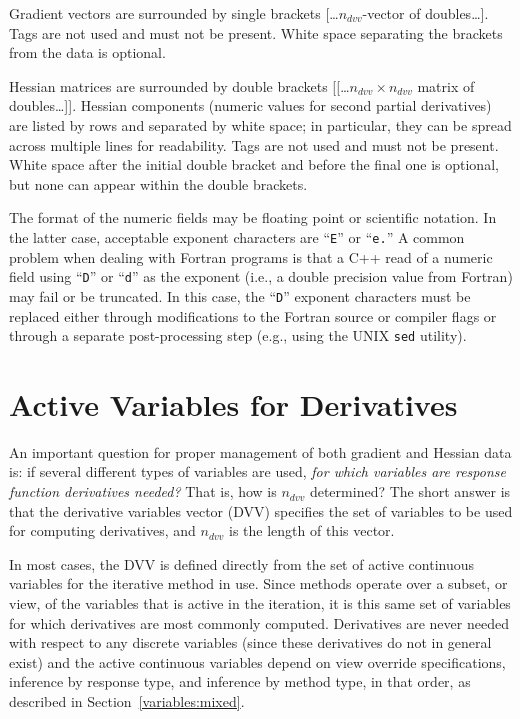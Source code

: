 Gradient vectors are surrounded by single brackets
[\ldots$n_{dvv}$-vector of doubles\ldots]. Tags are not used and must
not be present. White space separating the brackets from the data is
optional.

Hessian matrices are surrounded by double brackets
[[\ldots$n_{dvv} \times n_{dvv}$ matrix of doubles\ldots]].  Hessian
components (numeric values for second partial derivatives) are
listed by rows and separated by white space; in particular, they
can be spread across multiple
lines for readability.  Tags are not used and must not be present.
White space after the initial double bracket and before the final one
is optional, but none can appear within the double brackets.

The format of the numeric fields may be floating point or scientific
notation. In the latter case, acceptable exponent characters are
``\texttt{E}'' or ``\texttt{e.}'' A common problem when dealing with
Fortran programs is that a C++ read of a numeric field using
``\texttt{D}'' or ``\texttt{d}'' as the exponent (i.e., a double
precision value from Fortran) may fail or be truncated. In this case,
the ``\texttt{D}'' exponent characters must be replaced either through
modifications to the Fortran source or compiler flags or through a
separate post-processing step (e.g., using the UNIX \texttt{sed}
utility).

\section{Active Variables for Derivatives}\label{responses:active}

An important question for proper management of both gradient and
Hessian data is: if several different types of variables are used,
\emph{for which variables are response function derivatives needed?}
That is, how is $n_{dvv}$ determined?  The short answer is that the
derivative variables vector (DVV) specifies the set of variables to be
used for computing derivatives, and $n_{dvv}$ is the length of this
vector.  

In most cases, the DVV is defined directly from the set of active
continuous variables for the iterative method in use.  Since methods
operate over a subset, or view, of the variables that is active in the
iteration, it is this same set of variables for which derivatives are
most commonly computed.  Derivatives are never needed with respect to
any discrete variables (since these derivatives do not in general
exist) and the active continuous variables depend on view override
specifications, inference by response type, and inference by method
type, in that order, as described in Section~\ref{variables:mixed}.

